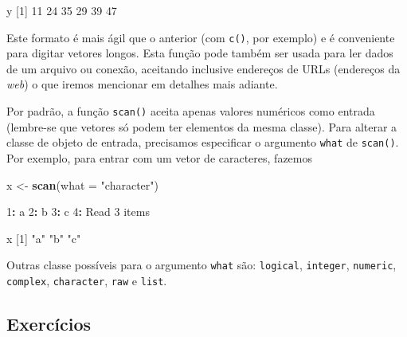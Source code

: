 \documentclass[10pt,a4paper]{book}
\newenvironment{Shaded}{\begin{snugshade}}{\end{snugshade}}
\newcommand{\KeywordTok}[1]{\textcolor[rgb]{0.13,0.29,0.53}{\textbf{#1}}}
\newcommand{\DataTypeTok}[1]{\textcolor[rgb]{0.13,0.29,0.53}{#1}}
\newcommand{\DecValTok}[1]{\textcolor[rgb]{0.00,0.00,0.81}{#1}}
\newcommand{\StringTok}[1]{\textcolor[rgb]{0.31,0.60,0.02}{#1}}
\newcommand{\OperatorTok}[1]{\textcolor[rgb]{0.81,0.36,0.00}{\textbf{#1}}}
\newcommand{\NormalTok}[1]{#1}
\begin{document}
\begin{Shaded}
\begin{Highlighting}[]
\NormalTok{y}
\NormalTok{[}\DecValTok{1}\NormalTok{] }\DecValTok{11} \DecValTok{24} \DecValTok{35} \DecValTok{29} \DecValTok{39} \DecValTok{47}
\end{Highlighting}
\end{Shaded}

Este formato é mais ágil que o anterior (com \texttt{c()}, por exemplo)
e é conveniente para digitar vetores longos. Esta função pode também ser
usada para ler dados de um arquivo ou conexão, aceitando inclusive
endereços de URLs (endereços da \emph{web}) o que iremos mencionar em
detalhes mais adiante.

Por padrão, a função \texttt{scan()} aceita apenas valores numéricos
como entrada (lembre-se que vetores só podem ter elementos da mesma
classe). Para alterar a classe de objeto de entrada, precisamos
especificar o argumento \texttt{what} de \texttt{scan()}. Por exemplo,
para entrar com um vetor de caracteres, fazemos

\begin{Shaded}
\begin{Highlighting}[]
\NormalTok{x <-}\StringTok{ }\KeywordTok{scan}\NormalTok{(}\DataTypeTok{what =} \StringTok{"character"}\NormalTok{)}

\DecValTok{1}\OperatorTok{:}\StringTok{ }\NormalTok{a}
\DecValTok{2}\OperatorTok{:}\StringTok{ }\NormalTok{b}
\DecValTok{3}\OperatorTok{:}\StringTok{ }\NormalTok{c}
\DecValTok{4}\OperatorTok{:}
\NormalTok{Read }\DecValTok{3}\NormalTok{ items}
\end{Highlighting}
\end{Shaded}

\begin{Shaded}
\begin{Highlighting}[]
\NormalTok{x}
\NormalTok{[}\DecValTok{1}\NormalTok{] }\StringTok{"a"} \StringTok{"b"} \StringTok{"c"}
\end{Highlighting}
\end{Shaded}

Outras classe possíveis para o argumento \texttt{what} são:
\texttt{logical}, \texttt{integer}, \texttt{numeric}, \texttt{complex},
\texttt{character}, \texttt{raw} e \texttt{list}.

\subsection*{Exercícios}\label{exercicios-9}
\end{document}
